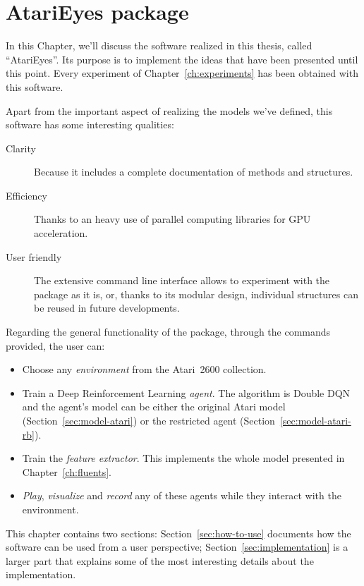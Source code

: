 \chapter{AtariEyes package}

\label{ch:atarieyes}

In this Chapter, we'll discuss the software realized in this thesis, called
``AtariEyes''. Its purpose is to implement the ideas that have been presented
until this point. Every experiment of Chapter~\ref{ch:experiments} has been
obtained with this software.

Apart from the important aspect of realizing the models we've defined, this
software has some interesting qualities:
\begin{description}
	\item [Clarity] Because it includes a complete documentation of methods
		and structures.
	\item [Efficiency] Thanks to an heavy use of parallel computing libraries
		for GPU acceleration.
	\item [User friendly] The extensive command line interface allows to
		experiment with the package as it is, or, thanks to its modular design,
		individual structures can be reused in future developments.
\end{description}

Regarding the general functionality of the package, through the commands
provided, the user can:
\begin{itemize}
	\item Choose any \emph{environment} from the Atari~2600 collection.
	\item Train a Deep Reinforcement Learning \emph{agent}. The algorithm is
		Double DQN and the agent's model can be either the original Atari model
		(Section~\ref{sec:model-atari}) or the restricted agent
		(Section~\ref{sec:model-atari-rb}).
	\item Train the \emph{feature extractor}. This implements the whole model
		presented in Chapter~\ref{ch:fluents}.
	\item \emph{Play}, \emph{visualize} and \emph{record} any of these
		agents while they interact with the environment.
\end{itemize}

This chapter contains two sections: Section~\ref{sec:how-to-use} documents
how the software can be used from a user perspective;
Section~\ref{sec:implementation} is a larger part that explains some of the
most interesting details about the implementation.


